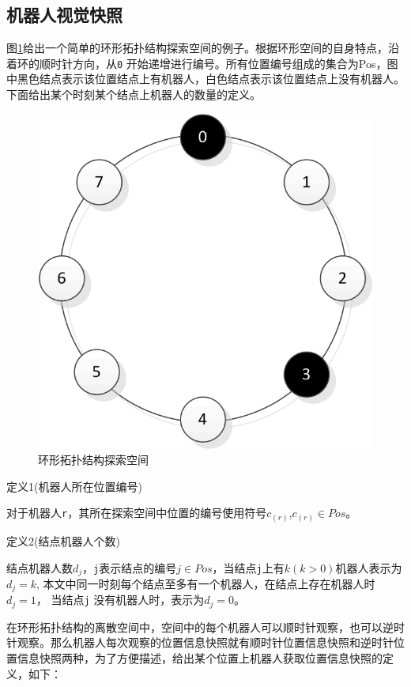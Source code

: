 \subsection{机器人视觉快照}
图\ref{fig:ring}给出一个简单的环形拓扑结构探索空间的例子。根据环形空间的自身特点，沿着环的顺时针方向，从\verb|0| 开始递增进行编号。所有位置编号组成的集合为Pos，图中黑色结点表示该位置结点上有机器人，白色结点表示该位置结点上没有机器人。下面给出某个时刻某个结点上机器人的数量的定义。

\vspace{0.5cm}

\begin{figure}[!hbt]
	\centering
	\includegraphics[width=2 in]{fig/ring.png}
	\caption{环形拓扑结构探索空间}
	\label{fig:ring}
\end{figure}

\vspace{0.5cm}

\begin{bfseries} 定义1\quad(机器人所在位置编号)\end{bfseries}对于机器人\verb|r|，其所在探索空间中位置的编号使用符号$c_{\left(r\right)}$,$c_{\left(r\right)} \in Pos$。

\vspace{0.5cm}

\begin{bfseries} 定义2\quad(结点机器人个数)\end{bfseries}结点机器人数$d_j$，\verb|j|表示结点的编号$j \in Pos $，当结点\verb|j|上有$k \left(k > 0\right)$机器人表示为$d_j = k$, 本文中同一时刻每个结点至多有一个机器人，在结点上存在机器人时$d_j = 1$， 当结点\verb|j| 没有机器人时，表示为$d_j = 0$。

\vspace{0.5cm}

在环形拓扑结构的离散空间中，空间中的每个机器人可以顺时针观察，也可以逆时针观察。那么机器人每次观察的位置信息快照就有顺时针位置信息快照和逆时针位置信息快照两种，为了方便描述，给出某个位置上机器人获取位置信息快照的定义，如下：

